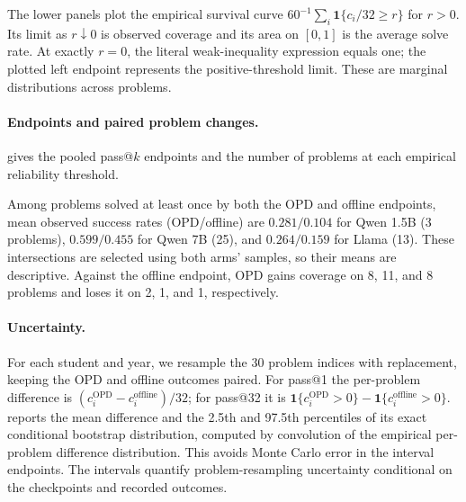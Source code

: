 The lower panels plot the empirical survival curve $60^{-1}\sum_i\mathbf1\{c_i/32\ge r\}$ for $r>0$. Its limit as $r\downarrow0$ is observed coverage and its area on $[0,1]$ is the average solve rate. At exactly $r=0$, the literal weak-inequality expression equals one; the plotted left endpoint represents the positive-threshold limit. These are marginal distributions across problems.

\paragraph{Endpoints and paired problem changes.}
 gives the pooled pass@$k$ endpoints and the number of problems at each empirical reliability threshold.

\begin{table}[t]
\centering\small
\setlength{\tabcolsep}{5pt}

\caption{Pooled AIME endpoints and observed reliability at 32 samples per problem (batch~a). Coverage, at-least-half, and all-32 columns count problems out of 60. Both Llama comparison arms start from the same prepared checkpoint and use the budgets in \cref{tab:preparation-budgets}.}
\label{tab:preparation-aime-summary}
\end{table}

Among problems solved at least once by both the OPD and offline endpoints, mean observed success rates (OPD/offline) are $0.281/0.104$ for Qwen 1.5B (3 problems), $0.599/0.455$ for Qwen 7B (25), and $0.264/0.159$ for Llama (13). These intersections are selected using both arms' samples, so their means are descriptive. Against the offline endpoint, OPD gains coverage on 8, 11, and 8 problems and loses it on 2, 1, and 1, respectively.


\paragraph{Uncertainty.}
For each student and year, we resample the 30 problem indices with replacement, keeping the OPD and offline outcomes paired. For pass@1 the per-problem difference is $(c_i^{\mathrm{OPD}}-c_i^{\mathrm{offline}})/32$; for pass@32 it is $\mathbf1\{c_i^{\mathrm{OPD}}>0\}-\mathbf1\{c_i^{\mathrm{offline}}>0\}$.  reports the mean difference and the 2.5th and 97.5th percentiles of its exact conditional bootstrap distribution, computed by convolution of the empirical per-problem difference distribution. This avoids Monte Carlo error in the interval endpoints. The intervals quantify problem-resampling uncertainty conditional on the checkpoints and recorded outcomes.

\begin{table}[t]
\centering\small
\setlength{\tabcolsep}{5pt}

\caption{OPD minus offline control at 32 samples per problem (batch~a), with 95\% paired problem-bootstrap percentile intervals computed separately within each year. Values are in probability units.}
\label{tab:preparation-aime-ci}
\end{table}

\FloatBarrier
